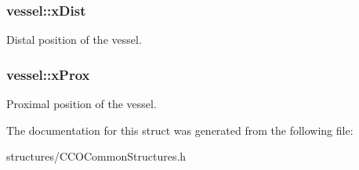 \subsubsection[{\texorpdfstring{x\+Dist}{xDist}}]{ vessel\+::x\+Dist}\hypertarget{structvessel_a0e84e9c1ccb9da3aea7145d63e803a30}{}\label{structvessel_a0e84e9c1ccb9da3aea7145d63e803a30}
Distal position of the vessel. 
\subsubsection[{\texorpdfstring{x\+Prox}{xProx}}]{ vessel\+::x\+Prox}\hypertarget{structvessel_adc62693cc81142b471ec2aa525ba3bf5}{}\label{structvessel_adc62693cc81142b471ec2aa525ba3bf5}
Proximal position of the vessel. 

The documentation for this struct was generated from the following file\+:\begin{DoxyCompactItemize}
\item 
structures/C\+C\+O\+Common\+Structures.\+h\end{DoxyCompactItemize}
